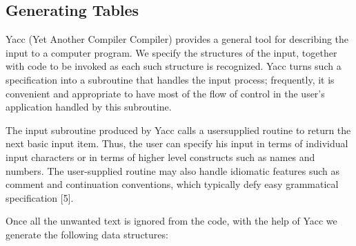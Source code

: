 \subsection{Generating Tables}
Yacc (Yet Another Compiler Compiler) provides a general tool for describing the input to a computer program. We specify the structures of the input, together with code to be invoked as each such structure is recognized. Yacc turns such a specification into a subroutine that handles the input process; frequently, it is convenient and appropriate to have most of the flow of control in the user's application handled by this subroutine.

The input subroutine produced by Yacc calls a usersupplied routine to return the next basic input item. Thus, the user can specify his input in terms of individual input characters or in terms of higher level constructs such as names and numbers. The user-supplied routine may also handle idiomatic features such as comment and continuation conventions, which typically defy easy grammatical specification [5]. 

Once all the unwanted text is ignored from the code, with the help of Yacc we generate the following data structures:

